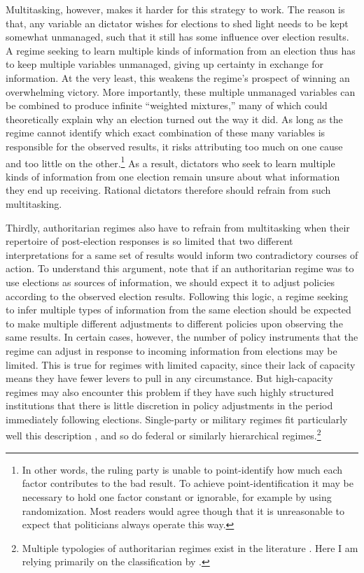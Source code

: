 \documentclass[12pt]{article}
\newcommand{\1}{\mathbbm{1}}
\begin{document}
Multitasking, however, makes it harder for this strategy to work. The reason is that, any variable an dictator wishes for elections to shed light needs to be kept somewhat unmanaged, such that it still has some influence over election results. A regime seeking to learn multiple kinds of information from an election thus has to keep multiple variables unmanaged, giving up certainty in exchange for information. At the very least, this weakens the regime's prospect of winning an overwhelming victory. More importantly, these multiple unmanaged variables can be combined to produce infinite ``weighted mixtures,'' many of which could theoretically explain why an election turned out the way it did. As long as the regime cannot identify which exact combination of these many variables is responsible for the observed results, it risks attributing too much on one cause and too little on the other.\footnote{In other words, the ruling party is unable to point-identify how much each factor contributes to the bad result. To achieve point-identification it may be necessary to hold one factor constant or ignorable, for example by using randomization. Most readers would agree though that it is unreasonable to expect that politicians always operate this way.}  As a result, dictators who seek to learn multiple kinds of information from one election remain unsure about what information they end up receiving. Rational dictators therefore should refrain from such multitasking.

Thirdly, authoritarian regimes also have to refrain from multitasking when their repertoire of post-election responses is so limited that two different interpretations for a same set of results would inform two contradictory courses of action. To understand this argument, note that if an authoritarian regime was to use elections as sources of information, we should expect it to adjust policies according to the observed election results. Following this logic, a regime seeking to infer multiple types of information from the same election should be expected to make multiple different adjustments to different policies upon observing the same results. In certain cases, however, the number of policy instruments that the regime can adjust in response to incoming information from elections may be limited. This is true for regimes with limited capacity, since their lack of capacity means they have fewer levers to pull in any circumstance. But high-capacity regimes may also encounter this problem if they have such highly structured institutions that there is little discretion in policy adjustments in the period immediately following elections. Single-party or military regimes fit particularly well this description , and so do federal or similarly hierarchical regimes.\footnote{Multiple typologies of authoritarian regimes exist in the literature \citep[see, for instance,][]{GeddesWrightFrantz2014, Wahman2013}. Here I am relying primarily on the classification by \citet{GeddesWrightFrantz2014}.}
\end{document}
